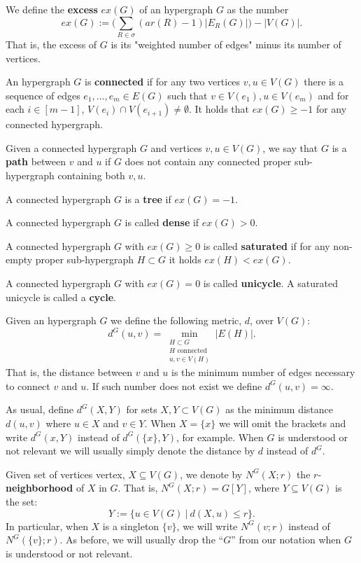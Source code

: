\documentclass[12pt,notitlepage,a4paper]{article}
\theoremstyle{definition}
\begin{document}
We define the \textbf{excess} $ex(G)$ of an hypergraph $G$ as the number
\[
ex(G):= \big(\sum_{R\in \sigma} (ar(R)-1)|E_R(G)|\big) - |V(G)|.  
\] 
That is, the excess of $G$ is its "weighted number of edges"
minus its number of vertices. \par
An hypergraph $G$ is \textbf{connected} if for any two vertices $v,u\in V(G)$
there is a sequence of edges $e_1,\dots, e_m\in E(G)$ such that
$v\in V(e_1), u\in V(e_m)$ and for each $i\in [m-1]$, 
$V(e_i)\cap V(e_{i+1})\neq \emptyset$. It holds that
$ex(G)\geq -1$ for any connected hypergraph.
\par Given a connected hypergraph $G$ 
and vertices $v,u\in V(G)$, we say that $G$ is
a \textbf{path} between $v$ and $u$
if $G$ 
does not contain any connected proper sub-hypergraph containing both $v,u$.
\par
A connected hypergraph $G$ is a \textbf{tree} if $ex(G)=-1$. 
\par A connected hypergraph $G$ is called \textbf{dense} if $ex(G)>0$.\par
A connected hypergraph $G$ with $ex(G)\geq 0$ is called \textbf{saturated} 
if for any non-empty proper sub-hypergraph
$H\subset G$ it holds $ex(H)<ex(G)$.
\par
A connected hypergraph $G$ with $ex(G)=0$ is called \textbf{unicycle}. 
A saturated unicycle is called a \textbf{cycle}. \par
Given an hypergraph $G$ we define the following metric, $d$, over $V(G)$:
\[ d^G(u,v)= \min_{\substack{H \subset G\\ 
		H \text{ connected }\\
		u,v\in V(H)}} |E(H)| .\]
That is, the distance between $v$ and $u$ is the minimum number of
edges necessary to connect $v$ and $u$. 
If such number does not exist we define $d^G(u,v)=\infty$. \par
As usual, define $d^{G}(X,Y)$ for sets $X,Y\subset V(G)$ as the minimum
distance $d(u,v)$ where $u\in X$ and $v\in Y$. 
When $X=\{x\}$ we will omit the brackets and write
$d^G(x,Y)$ instead of $d^G(\{x\},Y)$, for example.
When $G$ 
is understood or not relevant we will usually simply denote the 
distance by $d$ instead of $d^G$. \par

Given set of vertices vertex, $X\subseteq V(G)$, 
we denote by $N^G(X;r)$ the $r$-\textbf{neighborhood} of $X$ in 
$G$. That is,  $N^G(X;r)= G[Y]$, where $Y\subseteq V(G)$ is 
the set:
\[ Y:= \{ u \in V(G) \ | \ d(X,u)\leq r   \}. \]
In particular, when $X$ is a singleton $\{v\}$, we
will write $N^G(v;r)$ instead of $N^G(\{v\};r)$.
As before, we will usually drop the ``$G$'' from our 
notation when $G$ is understood or not relevant.  \par
\end{document}
